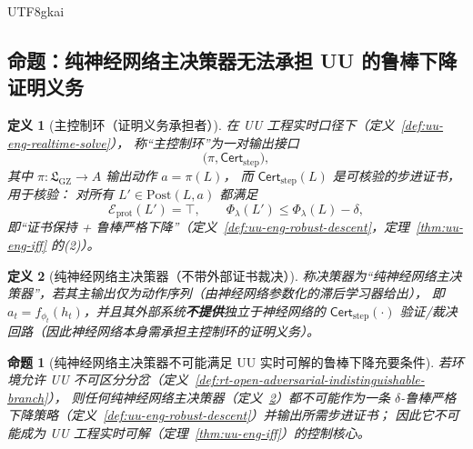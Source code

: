 \documentclass[12pt]{article}
\newtheorem{definition}{定义}[section]
\newtheorem{proposition}{命题}[section]
\newcommand{\GZLS}{\ensuremath{\mathfrak{L}_{\mathrm{GZ}}}}
\begin{document}
\begin{CJK*}{UTF8}{gkai}
\subsection{命题：纯神经网络主决策器无法承担 UU 的鲁棒下降证明义务}
\label{sec:nn-main-loop-not-core}

\begin{definition}[主控制环（证明义务承担者）]
\label{def:main-control-loop-proof-obligation}
在 UU 工程实时口径下（定义~\ref{def:uu-eng-realtime-solve}），
称“主控制环”为一对输出接口
\[
  \bigl(\pi,\mathsf{Cert}_{\mathrm{step}}\bigr),
\]
其中 $\pi:\GZLS\to A$ 输出动作 $a=\pi(L)$，
而 $\mathsf{Cert}_{\mathrm{step}}(L)$ 是可核验的步进证书，用于核验：
对所有 $L'\in\mathrm{Post}(L,a)$ 都满足
\[
  \mathcal{E}_{\mathrm{prot}}(L')=\top,\qquad
  \Phi_\lambda(L')\le \Phi_\lambda(L)-\delta,
\]
即“证书保持 + 鲁棒严格下降”（定义~\ref{def:uu-eng-robust-descent}，定理~\ref{thm:uu-eng-iff} 的(2)）。
\end{definition}

\begin{definition}[纯神经网络主决策器（不带外部证书裁决）]
\label{def:pure-nn-main-controller}
称决策器为“纯神经网络主决策器”，若其主输出仅为动作序列（由神经网络参数化的滞后学习器给出），
即 $a_t=f_{\phi_t}(h_t)$，并且其外部系统\textbf{不提供}独立于神经网络的
$\mathsf{Cert}_{\mathrm{step}}(\cdot)$ 验证/裁决回路（因此神经网络本身需承担主控制环的证明义务）。
\end{definition}

\begin{proposition}[纯神经网络主决策器不可能满足 UU 实时可解的鲁棒下降充要条件]
\label{prop:pure-nn-not-uu-robust-descent}
若环境允许 UU 不可区分分岔（定义~\ref{def:rt-open-adversarial-indistinguishable-branch}），
则任何纯神经网络主决策器（定义~\ref{def:pure-nn-main-controller}）都不可能作为一条
$\delta$-鲁棒严格下降策略（定义~\ref{def:uu-eng-robust-descent}）并输出所需步进证书；
因此它不可能成为 UU 工程实时可解（定理~\ref{thm:uu-eng-iff}）的控制核心。
\end{proposition}


\end{CJK*}
\end{document}
